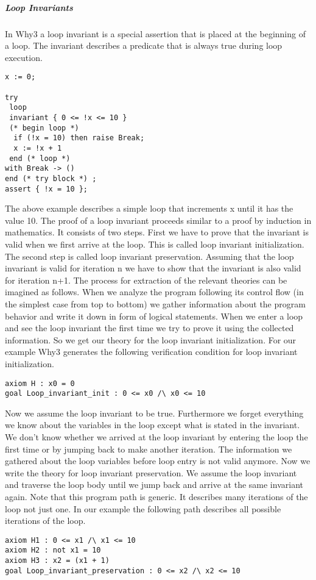 \subparagraph{Loop Invariants}

In Why3 a loop invariant is a special assertion that is placed at the
beginning of a loop. The invariant describes a predicate that is always true
during loop execution.
\begin{lstlisting}
x := 0;

try
 loop
 invariant { 0 <= !x <= 10 }
 (* begin loop *)
  if (!x = 10) then raise Break;
  x := !x + 1 
 end (* loop *)
with Break -> ()
end (* try block *) ;
assert { !x = 10 };
\end{lstlisting}
The above example describes a simple loop that increments x until it 
has the value 10. The proof of a loop invariant proceeds similar to a
proof by induction in mathematics. It consists of two steps. First we have
to prove that the invariant is valid when we first arrive at the loop. This
is called loop invariant initialization. The second step is called loop
invariant preservation. Assuming that the loop invariant is valid for
iteration n we have to show that the invariant is also valid for iteration n+1.
The process for extraction of the relevant theories can be imagined as
follows. When we analyze the program following its control flow 
(in the simplest case from top to bottom) we gather
information about the program behavior and write it down in form of
logical statements. When we enter a loop and see the loop invariant the
first time we try to prove it using the collected information. So we get
our theory for the loop invariant initialization. For our example Why3
generates the following verification condition for loop invariant
initialization.
\begin{lstlisting}
axiom H : x0 = 0
goal Loop_invariant_init : 0 <= x0 /\ x0 <= 10
\end{lstlisting}
Now we assume the loop invariant to be true. Furthermore we forget 
everything we know about the variables in the loop except what is stated
in the invariant. We don't know whether we arrived at the loop 
invariant by entering the loop the first time or by jumping back to make
another iteration. The information we gathered about the loop variables
before loop entry is not valid anymore. 
Now we write the theory for loop invariant preservation. We assume the
loop invariant and traverse the loop body until we jump back and arrive
at the same invariant again. Note that this program path is generic. It
describes many iterations of the loop not just one. In our example the following
path describes all possible iterations of the loop.
\begin{lstlisting}
axiom H1 : 0 <= x1 /\ x1 <= 10
axiom H2 : not x1 = 10
axiom H3 : x2 = (x1 + 1)
goal Loop_invariant_preservation : 0 <= x2 /\ x2 <= 10
\end{lstlisting}
